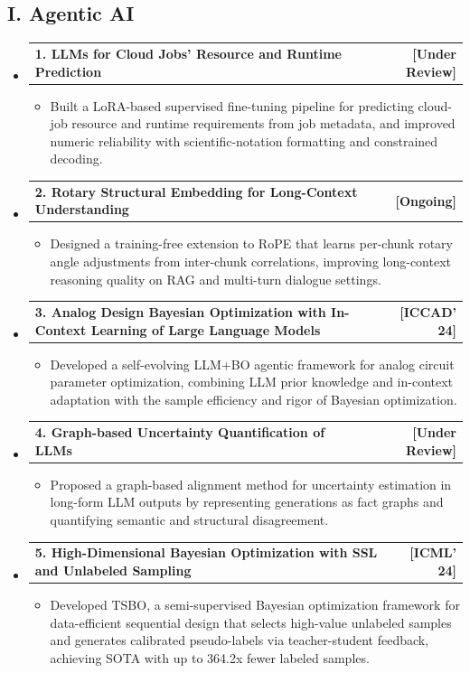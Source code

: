 \documentclass[letterpaper,11pt]{article}
\makeatletter
\newcommand{\resumeItem}[1]{
  \item\small{
    {#1 \vspace{-2pt}}
  }
}
\newcommand{\resumeSubheadingTwo}[2]{
  \vspace{-2pt}\item
    \begin{tabular*}{1\textwidth}[t]{l@{\extracolsep{\fill}}r}
      \textbf{#1} & \textbf{[#2]} \\
    \end{tabular*}\vspace{-7pt}
}
\newcommand{\resumeSubHeadingListStart}{\begin{itemize}[leftmargin=0.0in, label={}]}
\newcommand{\resumeSubHeadingListEnd}{\end{itemize}}
\newcommand{\resumeItemListStart}{\begin{itemize}}
\newcommand{\resumeItemListEnd}{\end{itemize}\vspace{-3pt}}
\makeatother
\begin{document}
\subsection*{I. Agentic AI}
  \resumeSubHeadingListStart
    \resumeSubheadingTwo
      {1. LLMs for Cloud Jobs' Resource and Runtime Prediction}{Under Review}
      \resumeItemListStart
        \resumeItem{Built a LoRA-based supervised fine-tuning pipeline for predicting cloud-job resource and runtime requirements from job metadata, and improved numeric reliability with scientific-notation formatting and constrained decoding.}
      \resumeItemListEnd
    \resumeSubheadingTwo
      {2. Rotary Structural Embedding for Long-Context Understanding}{Ongoing}
      \resumeItemListStart
        \resumeItem{Designed a training-free extension to RoPE that learns per-chunk rotary angle adjustments from inter-chunk correlations, improving long-context reasoning quality on RAG and multi-turn dialogue settings.}
      \resumeItemListEnd
    \resumeSubheadingTwo
      {3. Analog Design Bayesian Optimization with In-Context Learning of Large Language Models}{ICCAD' 24}
      \resumeItemListStart
        \resumeItem{Developed a self-evolving LLM+BO agentic framework for analog circuit parameter optimization, combining LLM prior knowledge and in-context adaptation with the sample efficiency and rigor of Bayesian optimization.}
      \resumeItemListEnd
    \resumeSubheadingTwo
      {4. Graph-based Uncertainty Quantification of LLMs}{Under Review}
      \resumeItemListStart
        \resumeItem{Proposed a graph-based alignment method for uncertainty estimation in long-form LLM outputs by representing generations as fact graphs and quantifying semantic and structural disagreement.}
      \resumeItemListEnd
    \resumeSubheadingTwo
      {5. High-Dimensional Bayesian Optimization with SSL and Unlabeled Sampling}{ICML' 24}
      \resumeItemListStart
        \resumeItem{Developed TSBO, a semi-supervised Bayesian optimization framework for data-efficient sequential design that selects high-value unlabeled samples and generates calibrated pseudo-labels via teacher-student feedback, achieving SOTA with up to 364.2x fewer labeled samples.}
      \resumeItemListEnd
  \resumeSubHeadingListEnd

\end{document}
